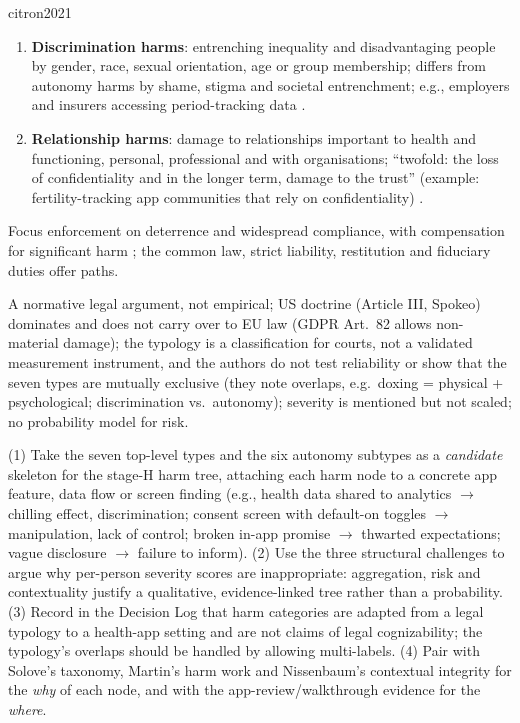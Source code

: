 \begin{papercard}{citron2021}
\begin{enumerate}[nosep,leftmargin=*]
\item \textbf{Discrimination harms}: entrenching inequality and disadvantaging people by gender, race, sexual orientation, age or group membership; differs from autonomy harms by shame, stigma and societal entrenchment; e.g., employers and insurers accessing period-tracking data .
\item \textbf{Relationship harms}: damage to relationships important to health and functioning, personal, professional and with organisations; ``twofold: the loss of confidentiality and in the longer term, damage to the trust'' (example: fertility-tracking app communities that rely on confidentiality) .
\end{enumerate}

 Focus enforcement on deterrence and widespread compliance, with compensation for significant harm ; the common law, strict liability, restitution and fiduciary duties offer paths.

 A normative legal argument, not empirical; US doctrine (Article III, Spokeo) dominates and does not carry over to EU law (GDPR Art.\ 82 allows non-material damage); the typology is a classification for courts, not a validated measurement instrument, and the authors do not test reliability or show that the seven types are mutually exclusive (they note overlaps, e.g.\ doxing = physical + psychological; discrimination vs.\ autonomy); severity is mentioned but not scaled; no probability model for risk.

 (1) Take the seven top-level types and the six autonomy subtypes as a \emph{candidate} skeleton for the stage-H harm tree, attaching each harm node to a concrete app feature, data flow or screen finding (e.g., health data shared to analytics $\to$ chilling effect, discrimination; consent screen with default-on toggles $\to$ manipulation, lack of control; broken in-app promise $\to$ thwarted expectations; vague disclosure $\to$ failure to inform). (2) Use the three structural challenges to argue why per-person severity scores are inappropriate: aggregation, risk and contextuality justify a qualitative, evidence-linked tree rather than a probability. (3) Record in the Decision Log that harm categories are adapted from a legal typology to a health-app setting and are not claims of legal cognizability; the typology's overlaps should be handled by allowing multi-labels. (4) Pair with Solove's taxonomy, Martin's harm work and Nissenbaum's contextual integrity for the \emph{why} of each node, and with the app-review/walkthrough evidence for the \emph{where}.
\end{papercard}
